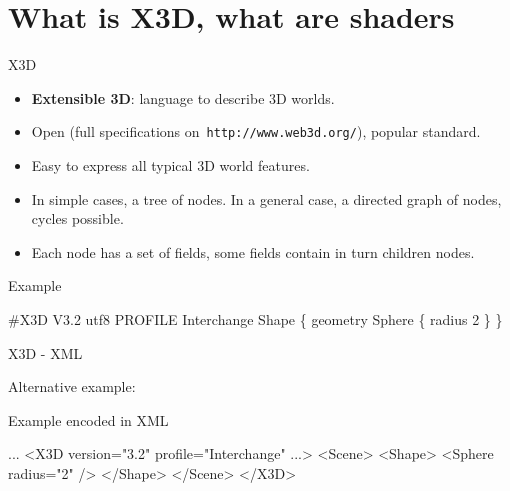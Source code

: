 \documentclass{beamer}
\begin{document}
\section{What is X3D, what are shaders}

\begin{frame}[fragile]{X3D}

\begin{itemize}
  \item \textbf{Extensible 3D}: language to describe 3D worlds.
  \item Open (full specifications on~\texttt{http://www.web3d.org/}), popular standard.
  \item Easy to express all typical 3D world features.
  \item In simple cases, a tree of nodes.
    In a general case, a directed graph of nodes, cycles possible.
  \item Each node has a set of fields, some fields contain in turn children nodes.
\end{itemize}

\begin{exampleblock}{Example}
\begin{semiverbatim}
\#X3D V3.2 utf8
PROFILE Interchange
Shape \{
  geometry Sphere \{ radius 2 \}
\}
\end{semiverbatim}
\end{exampleblock}
\end{frame}

\begin{frame}[fragile]{X3D - XML}

Alternative example:

\begin{exampleblock}{Example encoded in XML}
\begin{semiverbatim}
...
<X3D version="3.2" profile="Interchange" ...>
  <Scene>
    <Shape>
      <Sphere radius="2" />
    </Shape>
  </Scene>
</X3D>
\end{semiverbatim}
\end{exampleblock}

\end{frame}
\end{document}
